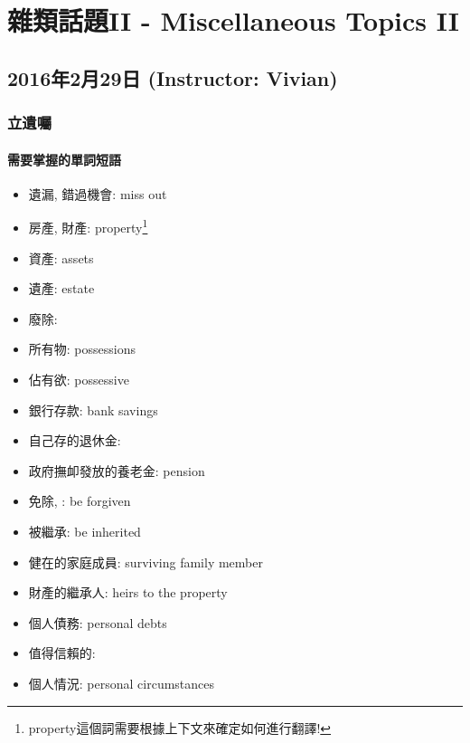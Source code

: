 \chapter{雜類話題II - Miscellaneous Topics II}
\section{2016年2月29日 (Instructor: Vivian)}
\subsection{立遺囑}
\subsubsection*{需要掌握的單詞短語}
\begin{multicols}{2}
\begin{itemize}
  \itemsep0em
  \item 遺漏, 錯過機會: miss out
  \item 房產, 財產: property\footnote{property這個詞需要根據上下文來確定如何進行翻譯!}
  \item 資產: assets
  \item 遺產: estate
  \item 廢除: 
  \item 所有物: possessions
  \item 佔有欲: possessive
  \item 銀行存款: bank savings
  \item 自己存的退休金: 
  \item 政府撫卹發放的養老金: pension
  \item 免除, : be forgiven
  \item 被繼承: be inherited
  \item 健在的家庭成員: surviving family member
  \item 財產的繼承人: heirs to the property
  \item 個人債務: personal debts
  \item 值得信賴的: 
  \item 個人情況: personal circumstances
\end{itemize}
\end{multicols}

